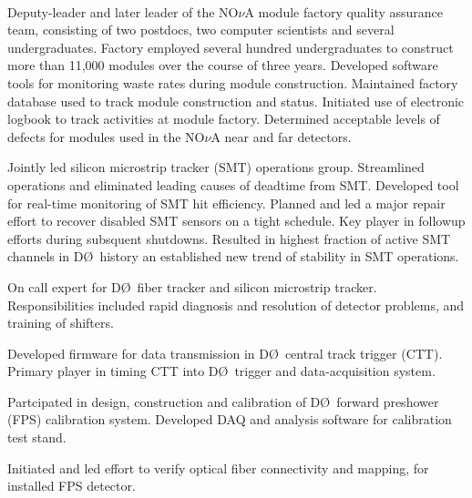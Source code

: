 \documentclass[amsmath,amssymb]{revtex4}
\def\dzero{D\O}
\begin{document}
\\
 
\begin{list}{}
            {\setlength{\itemsep}{0.0in}\setlength{\parsep}{0.0in}
             \addtolength{\parskip}{-0.5in}}
\item Deputy-leader and later leader of the  NO$\nu$A module
 factory quality assurance team, consisting of two postdocs, two
 computer scientists and several undergraduates.  Factory employed
 several hundred undergraduates to construct more than 11,000 modules
 over the course of three years.  Developed software tools for
 monitoring waste rates during module construction.  Maintained factory 
 database used to track module construction and status.  Initiated use of
 electronic logbook to track activities at module factory.  Determined
 acceptable levels of defects for modules used in the NO$\nu$A near and far
 detectors.  
\item Jointly led silicon microstrip tracker (SMT) operations group.
  Streamlined operations and eliminated leading causes of deadtime
  from SMT.  Developed tool for real-time monitoring of SMT hit
  efficiency.  Planned and led a major repair effort to
  recover disabled SMT sensors on a tight schedule.  Key player in
  followup efforts during subsquent shutdowns.  Resulted in highest
  fraction of active SMT channels in \dzero~history an established new
  trend of stability in SMT operations.
\item On call expert for \dzero~fiber tracker and silicon microstrip
  tracker.  Responsibilities included rapid diagnosis and
  resolution of detector problems, and training of shifters.
\item Developed firmware for data transmission in \dzero~central track
  trigger (CTT). Primary player in timing CTT into \dzero~trigger and
  data-acquisition system.
\item Partcipated in design, construction and calibration of
  \dzero~forward preshower (FPS) calibration system.  Developed DAQ
  and analysis software for calibration test stand.
\item Initiated and led effort to verify optical fiber connectivity
  and mapping, for installed FPS detector.
\end{list}

\\
\end{document}
